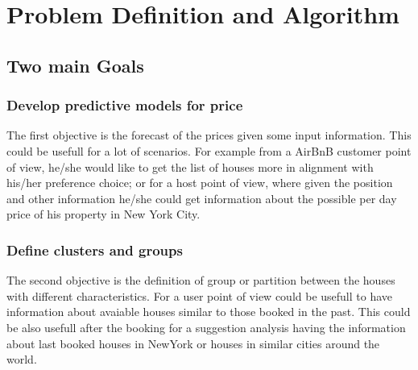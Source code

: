 \documentclass{FR16}
\begin{document}

\newpage
\section{Problem Definition and Algorithm}
\subsection{Two main Goals}

\subsubsection{Develop predictive models for price}
The first objective is the forecast of the prices given some input information. This could be usefull for a lot of scenarios. For example from a AirBnB customer point of view, he/she would like to get the list of houses more in alignment with his/her preference choice; or for a host point of view, where given the position and other information he/she could get information about the possible per day price of his property in New York City. 

\subsubsection{Define clusters and groups}
The second objective is the definition of group or partition between the houses with different characteristics. For a user point of view could be usefull to have information about avaiable houses similar to those booked in the past. This could be also usefull after the booking for a suggestion analysis having the information about last booked houses in NewYork or houses in similar cities around the world.
\newpage
\end{document}
